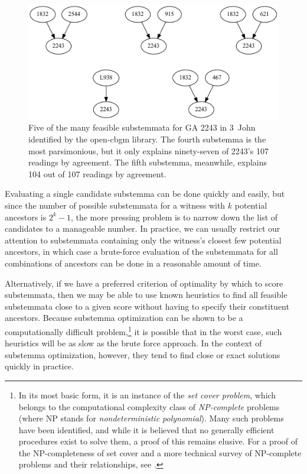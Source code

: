 \documentclass[a4paper, 12pt]{article}
\begin{document}
	\begin{figure}[h!]
		\centering
		\includegraphics[scale=0.6666]{../graphics/substemmata.pdf}
		\caption{Five of the many feasible substemmata for GA 2243 in 3~John identified by the \textsf{open-cbgm} library. The fourth substemma is the most parsimonious, but it only explains ninety-seven of 2243's 107 readings by agreement. The fifth substemma, meanwhile, explains 104 out of 107 readings by agreement.}
		\label{fig:substemmata}
	\end{figure}
	
	\newpage
	
	Evaluating a single candidate substemma can be done quickly and easily, but since the number of possible substemmata for a witness with $k$ potential ancestors is $2^k -1$, the more pressing problem is to narrow down the list of candidates to a manageable number. In practice, we can usually restrict our attention to substemmata containing only the witness's closest few potential ancestors, in which case a brute-force evaluation of the substemmata for all combinations of ancestors can be done in a reasonable amount of time.
	
	Alternatively, if we have a preferred criterion of optimality by which to score substemmata, then we may be able to use known heuristics to find all feasible substemmata close to a given score without having to specify their constituent ancestors. Because substemma optimization can be shown to be a computationally difficult problem,\footnote{In its most basic form, it is an instance of the \emph{set cover problem}, which belongs to the computational complexity class of \emph{NP-complete} problems (where NP stands for \emph{nondeterministic polynomial}). Many such problems have been identified, and while it is believed that no generally efficient procedures exist to solve them, a proof of this remains elusive. For a proof of the NP-completeness of set cover and a more technical survey of NP-complete problems and their relationships, see \cite{Karp72}.} it is possible that in the worst case, such heuristics will be as slow as the brute force approach. In the context of substemma optimization, however, they tend to find close or exact solutions quickly in practice.
	
\end{document}
